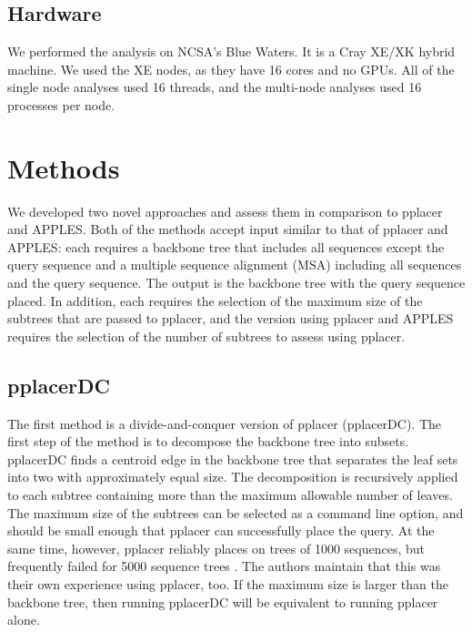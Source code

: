 \documentclass[10pt]{article}
\begin{document}
\subsection{Hardware}

We performed the analysis on NCSA's Blue Waters. It is a Cray XE/XK hybrid machine. We used the XE nodes, as they have 16 cores and no GPUs. All of the single node analyses used 16 threads, and the multi-node analyses used 16 processes per node.

\section{Methods}

We developed two novel approaches and assess them in comparison to pplacer and APPLES.
Both of the methods accept input similar to that of pplacer and APPLES:
each requires a backbone tree that includes all sequences except the query sequence and a multiple sequence alignment (MSA) including all sequences and the query sequence.
The output is the backbone tree with the query sequence placed.
In addition, each requires the selection of the maximum size of the subtrees that are passed to pplacer, and the version using pplacer and APPLES requires the selection of the number of subtrees to assess using pplacer.

\subsection{pplacerDC}

The first method is a divide-and-conquer version of pplacer (pplacerDC).
The first step of the method is to decompose the backbone tree into subsets.
pplacerDC finds a centroid edge in the backbone tree that separates the leaf
sets into two with approximately equal size.
The decomposition is recursively applied to each subtree containing more
than the maximum allowable number of leaves.
The maximum size of the subtrees can be selected as a command line option, and should be small enough that pplacer can successfully place the query.
At the same time, however, 
pplacer reliably places on trees of 1000 sequences, but frequently failed for 5000 sequence trees \cite{balaban_apples_2020}.
The authors maintain that this was their own experience using pplacer, too.
If the maximum size is larger than the backbone tree, then running pplacerDC will be equivalent to running pplacer alone.
\end{document}
